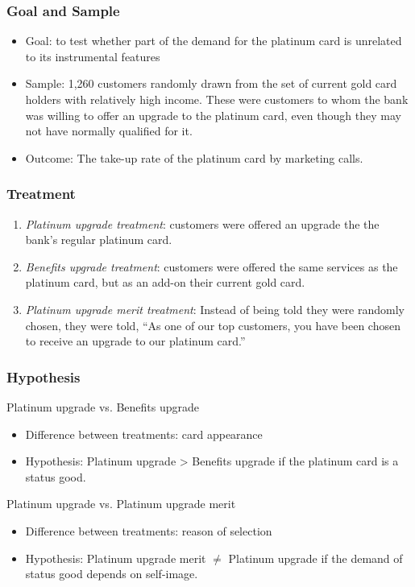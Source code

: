 \documentclass[unicode,12pt]{beamer}
\begin{document}
    \begin{frame}
        \frametitle{Goal and Sample}
    
        \begin{itemize}
            \item Goal: to test whether part of the demand for the platinum card is unrelated to its instrumental features
            \item Sample: 1,260 customers randomly drawn from the set of current gold card holders with relatively high income. These were customers to whom the bank was willing to offer an upgrade to the platinum card, even though they may not have normally qualified for it.
            \item Outcome: The take-up rate of the platinum card by marketing calls.
        \end{itemize}
    
    \end{frame}

    \begin{frame}
        \frametitle{Treatment}
    
        \begin{enumerate}
            \item \textit{Platinum upgrade treatment}: customers were offered an upgrade the the bank's regular platinum card.
            \item \textit{Benefits upgrade treatment}: customers were offered the same services as the platinum card, but as an add-on their current gold card.
            \item \textit{Platinum upgrade merit treatment}: Instead of being told they were randomly chosen, they were told, ``As one of our top customers, you have been chosen to receive an upgrade to our platinum card.''
        \end{enumerate}
         
    \end{frame}

    \begin{frame}
        \frametitle{Hypothesis}
    
        Platinum upgrade vs. Benefits upgrade
        \begin{itemize}
            \item Difference between treatments: card appearance
            \item Hypothesis: Platinum upgrade > Benefits upgrade if the platinum card is a status good.
        \end{itemize}
        Platinum upgrade vs. Platinum upgrade merit 
        \begin{itemize}
            \item Difference between treatments: reason of selection
            \item Hypothesis: Platinum upgrade merit $\not=$ Platinum upgrade if the demand of status good depends on self-image.
        \end{itemize}
    
    \end{frame}
\end{document}
